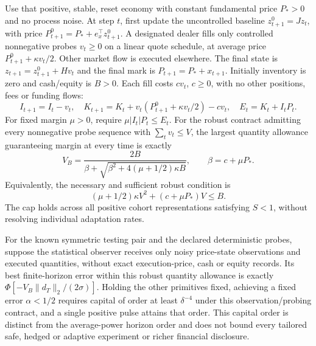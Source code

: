 \begin{theorem}
\label{thm:cash_capital_frontier}
Use that positive, stable, reset economy with constant fundamental price $P_*>0$ and no process noise. At step $t$, first update the uncontrolled baseline
$z^0_{t+1}=Jz_t$, with price $P^0_{t+1}=P_*+e_x^\top z^0_{t+1}$.
A designated dealer fills only controlled nonnegative probes $v_t\ge0$ on a linear quote schedule, at average price $P^0_{t+1}+\kappa v_t/2$. Other market flow is executed elsewhere. The final state is $z_{t+1}=z^0_{t+1}+Hv_t$ and the final mark is $P_{t+1}=P_*+x_{t+1}$. Initially inventory is zero and cash/equity is $B>0$. Each fill costs $cv_t$, $c\ge0$, with no other positions, fees or funding flows:
\[
I_{t+1}=I_t-v_t,\quad
K_{t+1}=K_t+v_t(P^0_{t+1}+\kappa v_t/2)-cv_t,
\quad E_t=K_t+I_tP_t.
\]
For fixed margin $\mu>0$, require $\mu|I_t|P_t\le E_t$. For the robust contract admitting every nonnegative probe sequence with $\sum_t v_t\le V$, the largest quantity allowance guaranteeing margin at every time is exactly
\begin{equation}
V_B=\frac{2B}{\beta+\sqrt{\beta^2+4(\mu+1/2)\kappa B}},
\qquad\beta=c+\mu P_*.
\label{eq:cash_quantity_cap}
\end{equation}
Equivalently, the necessary and sufficient robust condition is
\begin{equation}
(\mu+1/2)\kappa V^2+(c+\mu P_*)V\le B.
\label{eq:cash_margin_budget}
\end{equation}
The cap holds across all positive cohort representations satisfying $S<1$, without resolving individual adaptation rates.

For the known symmetric testing pair and the declared deterministic probes, suppose the statistical observer receives only noisy price-state observations and executed quantities, without exact execution-price, cash or equity records. Its best finite-horizon error within this robust quantity allowance is exactly $\Phi[-V_B\|d_T\|_2/(2\sigma)]$. Holding the other primitives fixed, achieving a fixed error $\alpha<1/2$ requires capital of order at least $\delta^{-4}$ under this observation/probing contract, and a single positive pulse attains that order. This capital order is distinct from the average-power horizon order and does not bound every tailored safe, hedged or adaptive experiment or richer financial disclosure.
\end{theorem}
